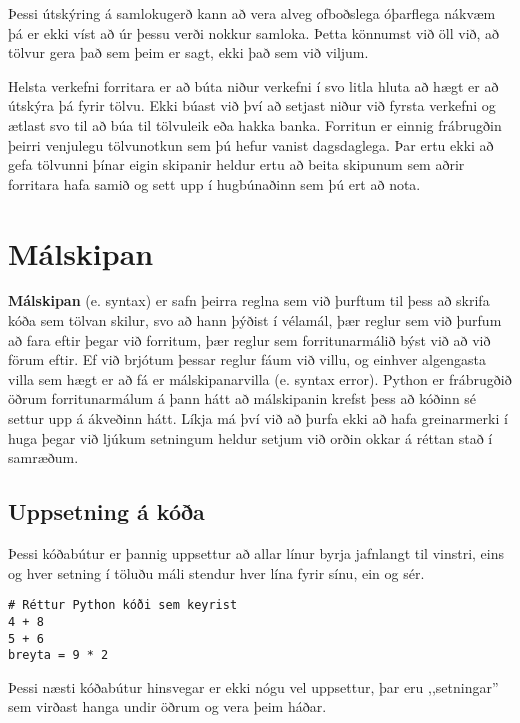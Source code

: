 Þessi útskýring á samlokugerð kann að vera alveg ofboðslega óþarflega nákvæm þá er ekki víst að úr þessu verði nokkur samloka.
Þetta könnumst við öll við, að tölvur gera það sem þeim er sagt, ekki það sem við viljum.

Helsta verkefni forritara er að búta niður verkefni í svo litla hluta að hægt er að útskýra þá fyrir tölvu.
Ekki búast við því að setjast niður við fyrsta verkefni og ætlast svo til að búa til tölvuleik eða hakka banka.
Forritun er einnig frábrugðin þeirri venjulegu tölvunotkun sem þú hefur vanist dagsdaglega.
Þar ertu ekki að gefa tölvunni þínar eigin skipanir heldur ertu að beita skipunum sem aðrir forritara hafa samið og sett upp í hugbúnaðinn sem þú ert að nota.


\section{Málskipan}

\textbf{Málskipan} (e. syntax) er safn þeirra reglna sem við þurftum til þess að skrifa kóða sem tölvan skilur, svo að hann þýðist í vélamál, þær reglur sem við þurfum að fara eftir þegar við forritum, þær reglur sem forritunarmálið býst við að við förum eftir. 
Ef við brjótum þessar reglur fáum við villu, og einhver algengasta villa sem hægt er að fá er málskipanarvilla (e. syntax error). 
Python er frábrugðið öðrum forritunarmálum á þann hátt að málskipanin krefst þess að kóðinn sé settur upp á ákveðinn hátt. 
Líkja má því við að þurfa ekki að hafa greinarmerki í huga þegar við ljúkum setningum heldur setjum við orðin okkar á réttan stað í samræðum.

\subsection{Uppsetning á kóða}
Þessi kóðabútur er þannig uppsettur að allar línur byrja jafnlangt til vinstri, eins og hver setning í töluðu máli stendur hver lína fyrir sínu, ein og sér.
\begin{lstlisting}[caption=Réttur Python kóði, label=lst:inng-kóðadæmi]
# Réttur Python kóði sem keyrist
4 + 8
5 + 6
breyta = 9 * 2
\end{lstlisting}

Þessi næsti kóðabútur hinsvegar er ekki nógu vel uppsettur, þar eru ,,setningar'' sem virðast hanga undir öðrum og vera þeim háðar.

